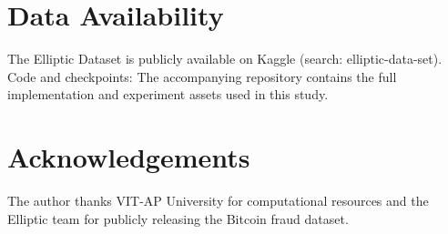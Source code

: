 \documentclass[11pt]{article}
\begin{document}
\section*{Data Availability}
The Elliptic Dataset is publicly available on Kaggle
(search: elliptic-data-set).
Code and checkpoints:
The accompanying repository contains the full implementation and
experiment assets used in this study.

\section*{Acknowledgements}
The author thanks VIT-AP University for computational resources and
the Elliptic team for publicly releasing the Bitcoin fraud dataset.



\end{document}
